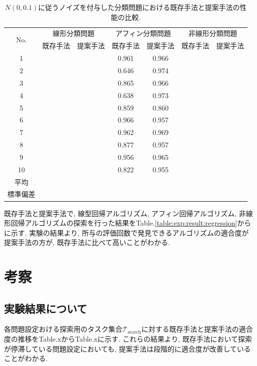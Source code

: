 \documentclass[11pt,oneside,openany,report]{jsbook}
\begin{document}
\begin{table}[tbp]
  \caption{$N(0,0.1)$に従うノイズを付与した分類問題における既存手法と提案手法の性能の比較.}
  \label{table:exp:result:classification_noizy_0.1}
  \centering
  \begin{tabular}{|c|c|c|c|c|c|c|}
    \hline
    \multirow{2}{*}{No. } & \multicolumn{2}{c|}{線形分類問題} & \multicolumn{2}{c|}{アフィン分類問題} & \multicolumn{2}{c|}{非線形分類問題} \\
    \cline{2-7}
    & 既存手法 & 提案手法 & 既存手法 & 提案手法 & 既存手法 & 提案手法 \\
    \hline \hline
    1       &   &  & 0.961 & 0.966 &  &  \\
    2       &   &  & 0.646 & 0.974 &  &  \\
    3       &   &  & 0.865 & 0.966 &  &  \\
    4       &   &  & 0.638 & 0.973 &  &  \\
    5       &   &  & 0.859 & 0.860 &  &  \\
    6       &   &  & 0.966 & 0.957 &  &  \\
    7       &   &  & 0.962 & 0.969 &  &  \\
    8       &   &  & 0.877 & 0.957 &  &  \\
    9       &   &  & 0.956 & 0.965 &  &  \\
    10      &   &  & 0.822 & 0.955 &  &  \\
    \hline
    平均 & & & & & & \\
    標準偏差 & & & & & & \\
    \hline
  \end{tabular}
\end{table}

既存手法と提案手法で, 線型回帰アルゴリズム, アフィン回帰アルゴリズム, 非線形回帰アルゴリズムの探索を行った結果をTable.\ref{table:exp:result:regression}からに示す. 実験の結果より, 所与の評価回数で発見できるアルゴリズムの適合度が提案手法の方が, 既存手法に比べて高いことがわかる.

\chapter{考察} \label{chap:consideration}

\section{実験結果について}
各問題設定おける探索用のタスク集合$\mathcal{T}_\mathrm{search}$に対する既存手法と提案手法の適合度の推移をTable.xからTable.xに示す. これらの結果より, 既存手法において探索が停滞している問題設定においても, 提案手法は段階的に適合度が改善していることがわかる.
\end{document}
